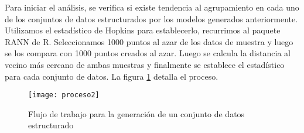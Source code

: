 Para iniciar el análisis, se verifica si existe tendencia al agrupamiento en cada uno de los conjuntos de datos estructurados por los modelos generados anteriormente. Utilizamos el estadístico de Hopkins para establecerlo, recurrimos al paquete RANN de R. Seleccionamos 1000 puntos al azar de los datos de muestra y luego se los compara con 1000 puntos creados al azar. Luego se calcula la distancia al vecino más cercano de ambas muestras y finalmente se establece el estadístico para cada conjunto de datos.  La figura  \ref{fig:proceso2} detalla el proceso.

\begin{figure}[H]
\texttt{[image: proceso2]}
\caption{Flujo de trabajo para la generación de un conjunto de datos estructurado }
\label{fig:proceso2}
\end{figure}

